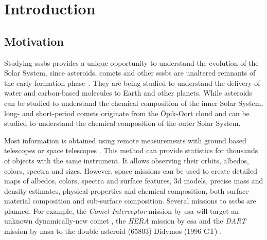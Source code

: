 \section{Introduction} \label{sec:introduction}



\subsection{Motivation}
Studying \glspl{sssb} provides a unique opportunity to understand the evolution of the Solar System, since asteroids, comets and other \glspl{sssb} are unaltered remnants of the early formation phase~\cite{walsh2018rubble, a2017comets}. They are being studied to understand the delivery of water and carbon-based molecules to Earth and other planets. While asteroids can be studied to understand the chemical composition of the inner Solar System, long- and short-period comets originate from the \"Opik-Oort cloud and can be studied to understand the chemical composition of the outer Solar System.

Most information is obtained using remote measurements with ground based telescopes or space telescopes \cite{bowles2018castaway}. This method can provide statistics for thousands of objects with the same instrument. It allows observing their orbits, albedos, colors, spectra and sizes. However, space missions can be used to create detailed maps of albedos, colors, spectra and surface features, \gls{3d} models, precise mass and density estimates, physical properties and chemical composition, both surface material composition and sub-surface composition. Several missions to \glspl{sssb} are planned. For example, the \textit{Comet Interceptor} mission by \gls{esa} will target an unknown dynamically-new comet \cite{snodgrass2019europeanCI}, the \textit{HERA} mission by \gls{esa} and the \textit{DART} mission by \gls{nasa} to the double asteroid (65803) Didymos (1996 GT) \cite{hera, talbert_2017DART}.

